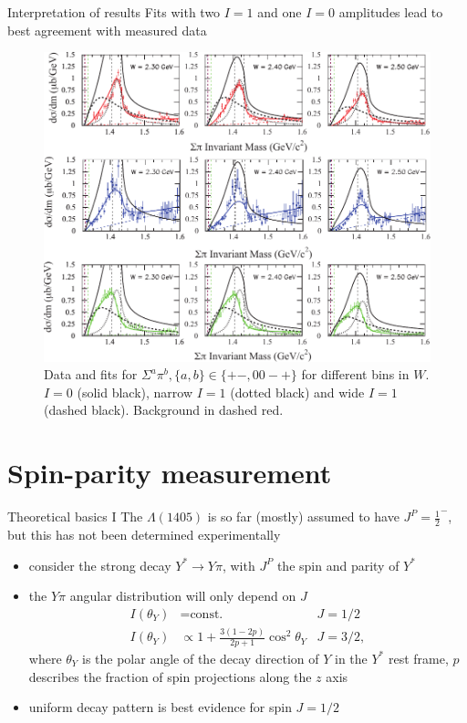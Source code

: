 \documentclass[11pt,aspectratio=1610,dvipsnames]{beamer}
\begin{document}
\begin{frame}{Interpretation of results}
	Fits with two $I=1$ and one $I=0$ amplitudes lead to best agreement with measured data 
	\begin{figure}
		\centering
		\includegraphics[width=.57\linewidth]{CLAS_lineshape_all}
		\caption*{Data and fits for $\Sigma^a\pi^b, \{a,b\}\in\{+-,00-+\}$  for different bins in $W$. $I=0$ (solid black), narrow $I=1$ (dotted black) and wide $I=1$ (dashed black). Background in dashed red. \citet{lineshapes}}
	\end{figure}
	
	
\end{frame}





\section{Spin-parity measurement}
\begin{frame}{Theoretical basics I}
	The $\Lambda(1405)$ is so far (mostly) assumed to have $J^P=\frac{1}{2}^-$, but this has not been determined experimentally
	\begin{tcolorbox}[colback=black!10,colframe=gray!20!black,title=Measuring spin] 
		\begin{itemize}
			\item consider the strong decay $Y^*\to Y\pi$, with $J^P$ the spin and parity of $Y^*$
			\item the $Y\pi$ angular distribution will only depend on $J$
			\begin{align*}
				I(\theta_Y)&=\text{const.} & J=1/2\\
				I(\theta_Y)&\propto 1+\frac{3(1-2p)}{2p+1}\cos^2\theta_Y& J=3/2,
			\end{align*}
			where $\theta_Y$ is the polar angle of the decay direction of $Y$ in the $Y^*$ rest frame, $p$ describes the fraction of spin projections along the $z$ axis 
			\item uniform decay pattern is best evidence for spin $J=1/2$
			
		\end{itemize}
	\end{tcolorbox}
	\begin{flushright}
	\end{flushright}
	
\end{frame}
\end{document}
